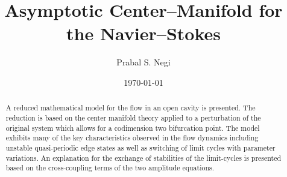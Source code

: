 \documentclass[aps,prr,twocolumn,groupedaddress]{revtex4-2}
\begin{document}
\title{Asymptotic Center--Manifold for the Navier--Stokes}
\author{Prabal S. Negi}

\date{\today}


\begin{abstract}
	A reduced mathematical model for the flow in an open cavity is presented. The reduction is based on the center manifold theory applied to a perturbation of the original system which allows for a codimension two bifurcation point. The model exhibits many of the key characteristics observed in the flow dynamics including unstable quasi-periodic edge states as well as switching of limit cycles with parameter variations. An explanation for the exchange of stabilities of the limit-cycles is presented based on the cross-coupling terms of the two amplitude equations.
\end{abstract}

\maketitle




\FloatBarrier



%
\end{document}
